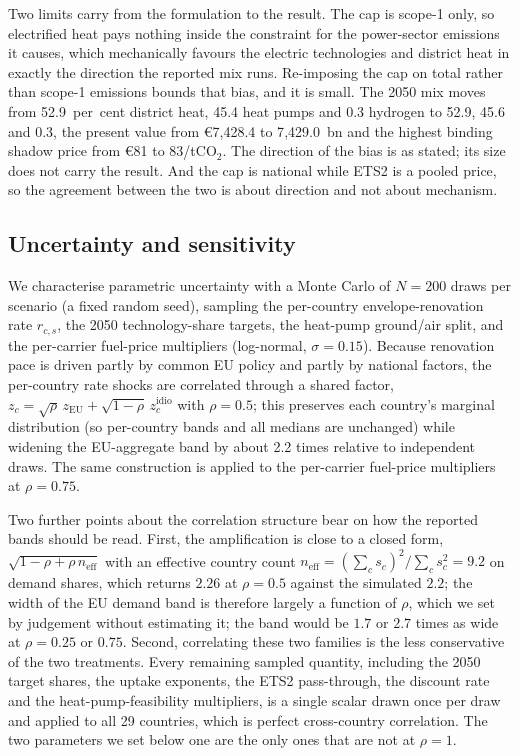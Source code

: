 Two limits carry from the formulation to the result. The cap is scope-1 only, so electrified
heat pays nothing inside the constraint for the power-sector emissions it causes, which
mechanically favours the electric technologies and district heat in exactly the direction the
reported mix runs. Re-imposing the cap on total rather than scope-1 emissions bounds that
bias, and it is small. The 2050 mix moves from 52.9~per~cent district heat, 45.4 heat pumps
and 0.3 hydrogen to 52.9, 45.6 and 0.3, the present value from \euro{}7{,}428.4 to
7{,}429.0~bn and the highest binding shadow price from \euro{}81 to 83/tCO$_2$. The
direction of the bias is as stated; its size does not carry the result. And the cap is national while ETS2 is a pooled price, so the agreement
between the two is about direction and not about mechanism.

\subsection{Uncertainty and sensitivity}
\label{sec:method:uncertainty}

We characterise parametric uncertainty with a Monte Carlo of $N=200$ draws per
scenario (a fixed random seed), sampling the per-country envelope-renovation rate
$r_{c,s}$, the 2050 technology-share targets, the heat-pump ground/air split, and
the per-carrier fuel-price multipliers (log-normal, $\sigma=0.15$). Because
renovation pace is driven partly by common EU policy and partly by national factors,
the per-country rate shocks are correlated through a shared factor,
$z_c=\sqrt{\rho}\,z_{\text{EU}}+\sqrt{1-\rho}\,z_c^{\text{idio}}$ with $\rho=0.5$;
this preserves each country's marginal distribution (so per-country bands and all
medians are unchanged) while widening the EU-aggregate band by about 2.2 times
relative to independent draws. The same construction is applied to the per-carrier
fuel-price multipliers at $\rho=0.75$.

Two further points about the correlation structure bear on how the reported bands
should be read. First, the amplification is
close to a closed form, $\sqrt{1-\rho+\rho\,n_{\mathrm{eff}}}$ with an effective
country count $n_{\mathrm{eff}}=(\sum_c s_c)^2/\sum_c s_c^2=9.2$ on demand shares,
which returns $2.26$ at $\rho=0.5$ against the simulated $2.2$; the width of the
EU demand band is therefore largely a function of $\rho$, which we set by judgement without estimating it; the band would be $1.7$ or $2.7$ times as wide at $\rho=0.25$ or $0.75$.
Second, correlating these two families is the less conservative of the two treatments.
Every remaining sampled quantity, including the 2050 target shares, the uptake
exponents, the ETS2 pass-through, the discount rate and the heat-pump-feasibility
multipliers, is a single scalar drawn once per draw and applied to all 29 countries,
which is perfect cross-country correlation. The two parameters we set below one are
the only ones that are not at $\rho=1$.

